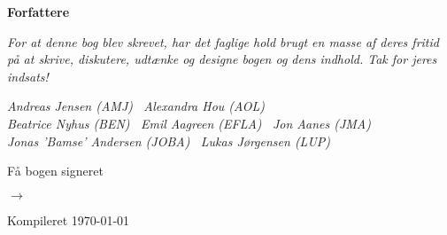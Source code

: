 \cleardoublepage
\begin{titlepage}
	\centering
	\vspace{3cm}
	{\Huge\sffamily\bfseries Forfattere \par} \vspace{0.5cm}
	{\small\itshape For at denne bog blev skrevet, har det faglige hold brugt en masse af deres fritid på at skrive, diskutere, udtænke og designe bogen og dens indhold. Tak for jeres indsats!\par} \vspace{0.75cm}
	{\itshape Andreas Jensen (AMJ) \, Alexandra Hou (AOL) \\ 
		Beatrice Nyhus (BEN) \, Emil Aagreen (EFLA) \, Jon Aanes (JMA) \\ 
		Jonas 'Bamse' Andersen (JOBA) \, Lukas Jørgensen (LUP)\par}
	\vfill
	{\large Få bogen signeret\par} \vspace{0.5cm}
	{\fontsize{50}{80} $\rightarrow$\par} \vspace{2cm}
	{Kompileret \today\par}
\end{titlepage}